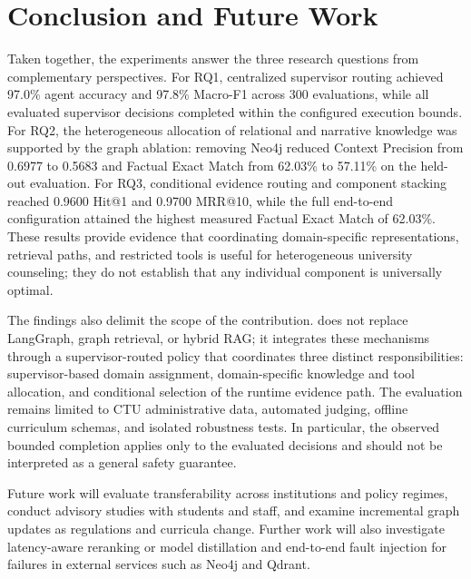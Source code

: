 \section{Conclusion and Future Work}
\label{sec:conclusion}

Taken together, the experiments answer the three research questions from complementary perspectives. For RQ1, centralized supervisor routing achieved 97.0\% agent accuracy and 97.8\% Macro-F1 across 300 evaluations, while all evaluated supervisor decisions completed within the configured execution bounds. For RQ2, the heterogeneous allocation of relational and narrative knowledge was supported by the graph ablation: removing Neo4j reduced Context Precision from 0.6977 to 0.5683 and Factual Exact Match from 62.03\% to 57.11\% on the held-out evaluation. For RQ3, conditional evidence routing and component stacking reached 0.9600 Hit@1 and 0.9700 MRR@10, while the full end-to-end configuration attained the highest measured Factual Exact Match of 62.03\%. These results provide evidence that coordinating domain-specific representations, retrieval paths, and restricted tools is useful for heterogeneous university counseling; they do not establish that any individual component is universally optimal.

The findings also delimit the scope of the contribution. \system{} does not replace LangGraph, graph retrieval, or hybrid RAG; it integrates these mechanisms through a supervisor-routed policy that coordinates three distinct responsibilities: supervisor-based domain assignment, domain-specific knowledge and tool allocation, and conditional selection of the runtime evidence path. The evaluation remains limited to CTU administrative data, automated judging, offline curriculum schemas, and isolated robustness tests. In particular, the observed bounded completion applies only to the evaluated decisions and should not be interpreted as a general safety guarantee.

Future work will evaluate transferability across institutions and policy regimes, conduct advisory studies with students and staff, and examine incremental graph updates as regulations and curricula change. Further work will also investigate latency-aware reranking or model distillation and end-to-end fault injection for failures in external services such as Neo4j and Qdrant.
